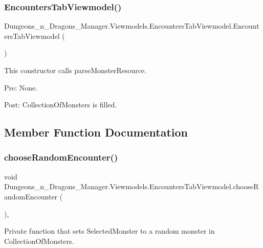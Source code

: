 \subsubsection{\texorpdfstring{Encounters\+Tab\+Viewmodel()}{EncountersTabViewmodel()}}
{\footnotesize\ttfamily Dungeons\+\_\+n\+\_\+\+Dragons\+\_\+\+Manager.\+Viewmodels.\+Encounters\+Tab\+Viewmodel.\+Encounters\+Tab\+Viewmodel (\begin{DoxyParamCaption}{ }\end{DoxyParamCaption})\hspace{0.3cm}{\ttfamily [inline]}}



This constructor calls parse\+Monster\+Resource. 

Pre\+: None.

Post\+: Collection\+Of\+Monsters is filled. 

\subsection{Member Function Documentation}
\mbox{\label{class_dungeons__n___dragons___manager_1_1_viewmodels_1_1_encounters_tab_viewmodel_a31ea129f6b42be81bbe4d002b24f0c9d}} 
\subsubsection{\texorpdfstring{choose\+Random\+Encounter()}{chooseRandomEncounter()}}
{\footnotesize\ttfamily void Dungeons\+\_\+n\+\_\+\+Dragons\+\_\+\+Manager.\+Viewmodels.\+Encounters\+Tab\+Viewmodel.\+choose\+Random\+Encounter (\begin{DoxyParamCaption}{ }\end{DoxyParamCaption})\hspace{0.3cm}{\ttfamily [inline]}, {\ttfamily [private]}}



Private function that sets Selected\+Monster to a random monster in Collection\+Of\+Monsters. 

